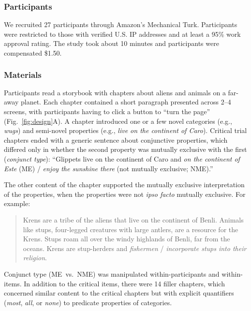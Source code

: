 \documentclass[10pt,letterpaper]{article}
\begin{document}
\subsubsection{Participants}

We recruited 27 participants through Amazon's Mechanical Turk.
Participants were restricted to those with verified U.S. IP addresses and at least a 95\% work approval rating. 
The study took about 10 minutes and participants were compensated \$1.50.

\subsubsection{Materials}

Participants read a storybook with chapters about aliens and animals on a far-away planet.
Each chapter contained a short paragraph presented across 2--4 screens, with participants having to click a button to ``turn the page'' (Fig.~\ref{fig:design}A).
A chapter introduced one or a few novel categories (e.g., \emph{wugs}) and semi-novel properties (e.g., \emph{live on the continent of Caro}).
Critical trial chapters ended with a generic sentence about conjunctive properties, which differed only in whether the second property was mutually exclusive with the first (\emph{conjunct type}): ``Glippets live on the continent of Caro and \emph{on the continent of Este} (ME) /  \emph{enjoy the sunshine there} (not mutually exclusive; NME).''

The other content of the chapter supported the mutually exclusive interpretation of the properties, when the properties were not \emph{ipso facto} mutually exclusive. For example: 

\vspace{-0.1cm}
\begin{quote}
\small
Krens are a tribe of the aliens that live on the continent of Benli. Animals like stups, four-legged creatures with large antlers, are a resource for the Krens. Stups roam all over the windy highlands of Benli, far from the oceans. Krens are stup-herders and \emph{fishermen} / \emph{incorporate stups into their religion}.
\end{quote}
\vspace{-0.1cm}


Conjunct type (ME~vs.~NME) was manipulated within-participants and within-items. 
In addition to the critical items, there were 14 filler chapters, which concerned similar content to the critical chapters but with explicit quantifiers (\emph{most}, \emph{all}, or \emph{none}) to predicate properties of categories. 
\end{document}
